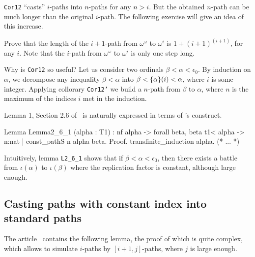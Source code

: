 \documentclass[a4paper]{book}
\begin{document}
\begin{remark}
 \texttt{Cor12} ``casts'' $i$-paths into $n$-paths for any $n>i$.
But the obtained $n$-path can be much longer than the original $i$-path.
The following exercise will give an idea of this increase. 
\end{remark}

\begin{exercise}
  Prove that  the length of the $i+1$-path from
  $\omega^\omega$ to $\omega^i$ is $1 + (i+1)^{(i+1)}$, for any $i$. Note that the $i$-path from
  $\omega^\omega$ to $\omega^i$ is only one step long.
 \end{exercise}


Why is \texttt{Cor12} so useful? 
Let us  consider two ordinals  $\beta<\alpha<\epsilon_0$. By induction on $\alpha$,
we decompose any inequality $\beta<\alpha$ into $\beta < \mbox{$\{\alpha\}(i)$}< \alpha$, where $i$ is some integer. Applying collorary \texttt{Cor12'} we build a $n$-path from $\beta$ to $\alpha$,
where $n$ is the maximum of the indices $i$ met in the induction.

 Lemma 1, Section 2.6 of~\cite{KS81} is naturally expressed in terms of \coq's
\verb@sig@ construct.

\label{lemma:L-2_6-1}

\begin{Coqsrc}
Lemma Lemma2_6_1 (alpha : T1) :  
  nf alpha -> forall beta,  beta t1< alpha  ->
  {n:nat | const_pathS n alpha beta}.
Proof.
  transfinite_induction alpha.
  (* ... *)
\end{Coqsrc}



Intuitively, lemma   \texttt{L2\_6\_1}  shows that if $\beta<\alpha<\epsilon_0$, then there exists  a battle from $\iota(\alpha)$ to $\iota(\beta)$ where the replication factor is constant, although large enough. 







\subsection{Casting paths with constant index into standard paths}


The article~\cite{KS81} contains 
the following lemma, the proof of which is quite complex, which allows to simulate $i$-paths by $[i+1,j]$-paths, where $j$ is large enough.
\end{document}
